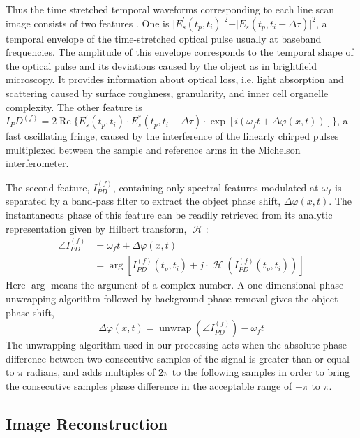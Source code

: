 \documentclass[aps,pra,reprint,superscriptaddress]{revtex4-1}
\DeclareMathOperator{\hilbert}{\mathcal{H}} %
\DeclareMathOperator{\unwrap}{unwrap} %
\begin{document}
Thus the time stretched temporal waveforms corresponding to each line scan image consists of two features \cite{mahjoubfar2014label}. One is $\rvert E_s^\prime(t_p,t_i) \lvert^2 + \rvert E_s(t_p,t_i-\Delta\tau) \lvert^2$, a temporal envelope of the time-stretched optical pulse usually at baseband frequencies. The amplitude of this envelope corresponds to the temporal shape of the optical pulse and its deviations caused by the object as in brightfield microscopy. It provides information about optical loss, i.e. light absorption and scattering caused by surface roughness, granularity, and inner cell organelle complexity. The other feature is $I_PD^{(f)} = 2 \operatorname{Re}\lbrace E_s^\prime(t_p,t_i) \cdot E_s^*(t_p,t_i-\Delta\tau) \cdot \exp[i(\omega_f t + \Delta\varphi(x,t))] \rbrace$, a fast oscillating fringe, caused by the interference of the linearly chirped pulses multiplexed between the sample and reference arms in the Michelson interferometer.

The second feature, $I_{PD}^{(f)}$, containing only spectral features modulated at $\omega_f$ is separated by a band-pass filter to extract the object phase shift, $\Delta\varphi(x,t)$. The instantaneous phase of this feature can be readily retrieved from its analytic representation given by Hilbert transform, $\hilbert$:
\begin{align}
\angle I_{PD}^{(f)} &= \omega_f t + \Delta\varphi(x,t) \\
&= \arg[I_{PD}^{(f)} (t_p,t_i ) + j \cdot \hilbert(I_{PD}^{(f)}(t_p,t_i))]
\end{align}
Here $\arg$ means the argument of a complex number. A one-dimensional phase unwrapping algorithm followed by background phase removal gives the object phase shift, 
\begin{equation}
\Delta\varphi(x,t) = \unwrap(\angle I_{PD}^{(f)}) - \omega_f t
\end{equation}
The unwrapping algorithm used in our processing acts when the absolute phase difference between two consecutive samples of the signal is greater than or equal to $\pi$ radians, and adds multiples of $2\pi$ to the following samples in order to bring the consecutive samples phase difference in the acceptable range of $-\pi$ to $\pi$.

\subsection{Image Reconstruction}
\end{document}
